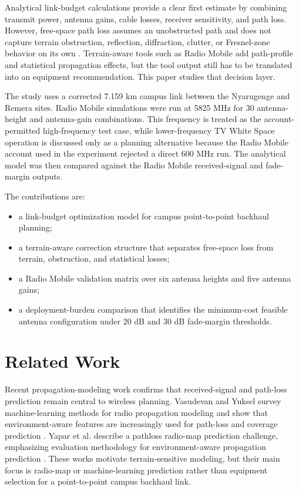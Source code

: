 \documentclass[journal]{IEEEtran}
\begin{document}
Analytical link-budget calculations provide a clear first estimate by combining transmit power, antenna gains, cable losses, receiver sensitivity, and path loss. However, free-space path loss assumes an unobstructed path and does not capture terrain obstruction, reflection, diffraction, clutter, or Fresnel-zone behavior on its own \cite{rappaport2002wireless,molisch2011wireless}. Terrain-aware tools such as Radio Mobile add path-profile and statistical propagation effects, but the tool output still has to be translated into an equipment recommendation. This paper studies that decision layer.

The study uses a corrected 7.159 km campus link between the Nyarugenge and Remera sites. Radio Mobile simulations were run at 5825 MHz for 30 antenna-height and antenna-gain combinations. This frequency is treated as the account-permitted high-frequency test case, while lower-frequency TV White Space operation is discussed only as a planning alternative because the Radio Mobile account used in the experiment rejected a direct 600 MHz run. The analytical model was then compared against the Radio Mobile received-signal and fade-margin outputs.

The contributions are:
\begin{itemize}
    \item a link-budget optimization model for campus point-to-point backhaul planning;
    \item a terrain-aware correction structure that separates free-space loss from terrain, obstruction, and statistical losses;
    \item a Radio Mobile validation matrix over six antenna heights and five antenna gains;
    \item a deployment-burden comparison that identifies the minimum-cost feasible antenna configuration under 20 dB and 30 dB fade-margin thresholds.
\end{itemize}

\section{Related Work}

Recent propagation-modeling work confirms that received-signal and path-loss prediction remain central to wireless planning. Vasudevan and Yuksel survey machine-learning methods for radio propagation modeling and show that environment-aware features are increasingly used for path-loss and coverage prediction \cite{vasudevan2024machine}. Yapar et al. describe a pathloss radio-map prediction challenge, emphasizing evaluation methodology for environment-aware propagation prediction \cite{yapar2024overview}. These works motivate terrain-sensitive modeling, but their main focus is radio-map or machine-learning prediction rather than equipment selection for a point-to-point campus backhaul link.
\end{document}
